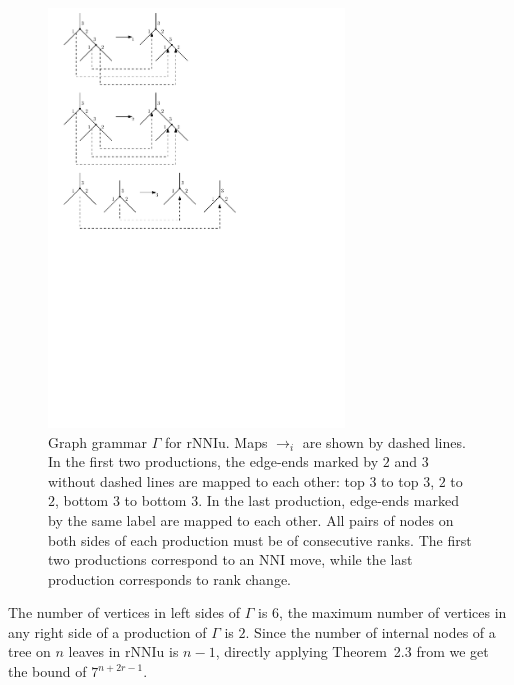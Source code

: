 \documentclass{amsart}
\theoremstyle{definition}
\newcommand{\nni}{\mathrm{NNI}}
\newcommand{\rnniu}{\mathrm{rNNIu}}
\begin{document}
\begin{figure}
\centering
\includegraphics[width=0.7\textwidth]{grammar_rNNIu.pdf}
\caption{Graph grammar $\Gamma$ for $\rnniu$.
Maps $\to_i$ are shown by dashed lines.
In the first two productions, the edge-ends marked by $2$ and $3$ without dashed lines are mapped to each other: top $3$ to top $3$, $2$ to $2$, bottom $3$ to bottom $3$.
In the last production, edge-ends marked by the same label are mapped to each other.
All pairs of nodes on both sides of each production must be of consecutive ranks.
The first two productions correspond to an $\nni$ move, while the last production corresponds to rank change.}
\label{grammar_rNNIu.pdf}
\end{figure}

The number of vertices in left sides of $\Gamma$ is $6$, the maximum number of vertices in any right side of a production of $\Gamma$ is $2$.
Since the number of internal nodes of a tree on $n$ leaves in $\rnniu$ is $n-1$, directly applying Theorem~2.3 from \autocite{Sleator1992-bp} we get the bound of $7^{n+2r-1}$.
\end{document}
